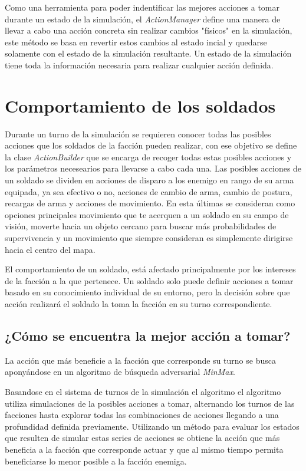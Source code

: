 \documentclass[twoside]{article}
\begin{document}
		Como una herramienta para poder indentificar las mejores acciones a tomar durante un estado de la simulaci\'on, el \emph{ActionManager} define una manera de llevar a cabo una acci\'on concreta sin realizar cambios "f\'isicos" en la simulaci\'on, este m\'etodo se basa en revertir estos cambios al estado incial y quedarse solamente con el estado de la simulaci\'on resultante. Un estado de la simulaci\'on tiene toda la informaci\'on necesaria para realizar cualquier acci\'on definida.
		
		
		
		\section{Comportamiento de los soldados}
		
		Durante un turno de la simulaci\'on se requieren conocer todas las posibles acciones que los soldados de la facci\'on pueden realizar, con ese objetivo se define la clase \emph{ActionBuilder} que se encarga de recoger todas estas posibles acciones y los par\'ametros necesearios para llevarse a cabo cada una. Las posibles acciones de un soldado se dividen en acciones de disparo a los enemigo en rango de su arma equipada, ya sea efectivo o no, acciones de cambio de arma, cambio de postura, recargas de arma y acciones de movimiento. En esta \'ultimas se consideran como opciones principales movimiento que te acerquen a un soldado en su campo de visi\'on, moverte hacia un objeto cercano para buscar m\'as probabilidades de supervivencia y un movimiento que siempre consideran es simplemente dirigirse hacia el centro del mapa.
		
		El comportamiento de un soldado, est\'a afectado principalmente por los intereses de la facci\'on a la que pertenece. Un soldado solo puede definir acciones a tomar basado en su conocimiento individual de su entorno, pero la decisi\'on sobre que acci\'on realizar\'a el soldado la toma la facci\'on en su turno correspondiente.
		
		\subsection{¿C\'omo se encuentra la mejor acci\'on a tomar?}
		
		La acci\'on que m\'as beneficie a la facci\'on que corresponde su turno se busca apony\'andose en un algoritmo de b\'usqueda adversarial \emph{MinMax}.
		
		Basandose en el sistema de turnos de la simulaci\'on el algoritmo el algoritmo utiliza simulaciones de la posibles acciones a tomar, alternando los turnos de las facciones hasta explorar todas las combinaciones de acciones llegando a una profundidad definida previamente. Utilizando un m\'etodo para evaluar los estados que resulten de simular estas series de acciones se obtiene la acci\'on que m\'as beneficia a la facci\'on que corresponde actuar y que al mismo tiempo permita beneficiarse lo menor posible a la facci\'on enemiga.
		
\end{document}
